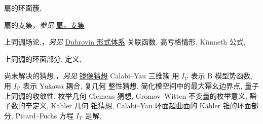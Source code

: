 \begin{theindex}
\subitem \leavevmode\hypertarget{idx:0307}{扇的环面簇},\enspace{}
\indexspace
\item \leavevmode\hypertarget{idx:1317}{扇的支集}，\textit{参见} \hyperlink{idx:0304}{扇，支集}
\indexspace
\item \leavevmode\hypertarget{idx:0126}{上同调场论},\enspace{}，\textit{另见} \hyperlink{idx:0235}{Dubrovin 形式体系}
\subitem \leavevmode\hypertarget{idx:0127}{关联函数},\enspace{}
\subitem \leavevmode\hypertarget{idx:0128}{高亏格情形},\enspace{}
\subitem \leavevmode\hypertarget{idx:0129}{Künneth 公式},\enspace{}
\indexspace
\item \leavevmode\hypertarget{idx:1351}{上同调的环面部分},\enspace{}
\subitem \leavevmode\hypertarget{idx:1352}{定义},\enspace{}
\indexspace
\item \leavevmode\hypertarget{idx:0967}{尚未解决的猜想},\enspace{}，\textit{另见} \hyperlink{idx:0786}{镜像猜想}
\subitem \leavevmode\hypertarget{idx:0968}{Calabi--Yau 三维簇}
\subsubitem \leavevmode\hypertarget{idx:0969}{用 $I_{\mathcal V}$ 表示 B 模型势函数},\enspace{}
\subsubitem \leavevmode\hypertarget{idx:0970}{用 $I_{\mathcal V}$ 表示 Yukawa 耦合},\enspace{}
\subitem \leavevmode\hypertarget{idx:0971}{复几何}
\subsubitem \leavevmode\hypertarget{idx:0972}{整性猜想},\enspace{}
\subsubitem \leavevmode\hypertarget{idx:0973}{简化模空间中的最大幂幺边界点},\enspace{}
\subitem \leavevmode\hypertarget{idx:0974}{量子上同调的收敛性},\enspace{}
\subitem \leavevmode\hypertarget{idx:0975}{枚举几何}
\subsubitem \leavevmode\hypertarget{idx:0976}{Clemens 猜想},\enspace{}
\subsubitem \leavevmode\hypertarget{idx:0977}{Gromov--Witten 不变量的枚举意义},\enspace{}
\subsubitem \leavevmode\hypertarget{idx:0978}{瞬子数的辛定义},\enspace{}
\subitem \leavevmode\hypertarget{idx:0979}{Kähler 几何}
\subsubitem \leavevmode\hypertarget{idx:0980}{锥猜想},\enspace{}
\subsubitem \leavevmode\hypertarget{idx:0981}{Calabi--Yau 环面超曲面的 Kähler 锥的环面部分},\enspace{}
\subitem \leavevmode\hypertarget{idx:0982}{Picard--Fuchs 方程}
\subsubitem \leavevmode\hypertarget{idx:0983}{$I_{\mathcal V}$ 是解},\enspace{}

\end{theindex}
